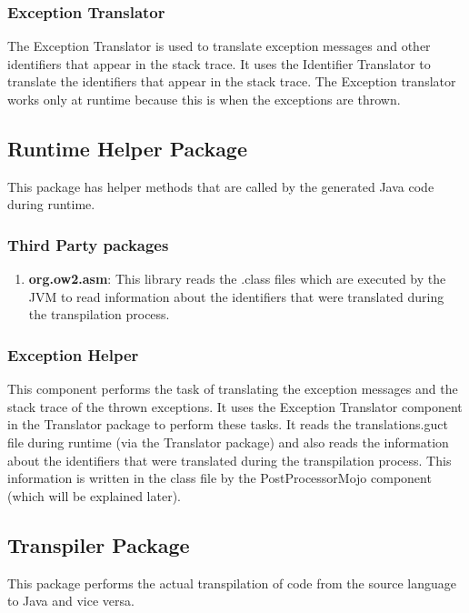 \subsubsection{Exception Translator}
The Exception Translator is used to translate exception messages and other identifiers that appear in the stack trace. It uses the Identifier Translator to translate the identifiers that appear in the stack trace. The Exception translator works only at runtime because this is when the exceptions are thrown.
\subsection{Runtime Helper Package}
This package has helper methods that are called by the generated Java code during runtime. 
\subsubsection{Third Party packages}
\begin{enumerate}
    \item \textbf{org.ow2.asm}: This library reads the .class files which are executed by the \ac{JVM} to read information about the identifiers that were translated during the transpilation process.
\end{enumerate}
\subsubsection{Exception Helper}
This component performs the task of translating the exception messages and the stack trace of the thrown exceptions. It uses the Exception Translator component in the Translator package to perform these tasks. It reads the translations.guct file during runtime (via the Translator package) and also reads the information about the identifiers that were translated during the transpilation process. This information is written in the class file by the PostProcessorMojo component (which will be explained later).
\subsection{Transpiler Package}
This package performs the actual transpilation of code from the source language to Java and vice versa. 
